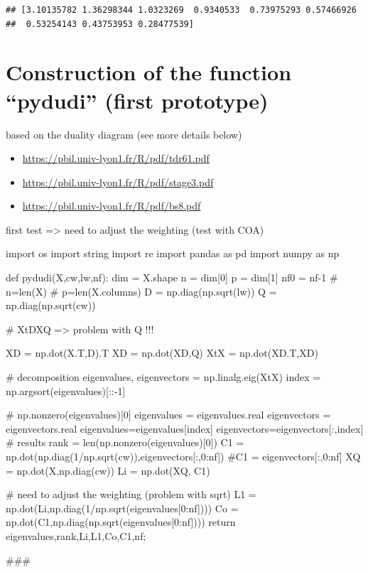 \documentclass[
  10pt,
]{article}
\newenvironment{Shaded}{\begin{snugshade}}{\end{snugshade}}
\newcommand{\NormalTok}[1]{#1}
\providecommand{\tightlist}{%
  \setlength{\itemsep}{0pt}\setlength{\parskip}{0pt}}
\begin{document}
\begin{verbatim}
## [3.10135782 1.36298344 1.0323269  0.9340533  0.73975293 0.57466926
##  0.53254143 0.43753953 0.28477539]
\end{verbatim}

\hypertarget{construction-of-the-function-pydudi-first-prototype}{%
\section{Construction of the function ``pydudi'' (first
prototype)}\label{construction-of-the-function-pydudi-first-prototype}}

based on the duality diagram (see more details below)

\begin{itemize}
\tightlist
\item
  \url{https://pbil.univ-lyon1.fr/R/pdf/tdr61.pdf}
\item
  \url{https://pbil.univ-lyon1.fr/R/pdf/stage3.pdf}
\item
  \url{https://pbil.univ-lyon1.fr/R/pdf/bs8.pdf}
\end{itemize}

first test =\textgreater{} need to adjust the weighting (test with COA)

\begin{Shaded}
\begin{Highlighting}[]
\NormalTok{import os}
\NormalTok{import string}
\NormalTok{import re}
\NormalTok{import pandas as pd}
\NormalTok{import numpy as np}

\NormalTok{def pydudi(X,cw,lw,nf):}
\NormalTok{  dim = X.shape}
\NormalTok{  n = dim[0]}
\NormalTok{  p = dim[1]}
\NormalTok{  nf0 = nf{-}1}
\NormalTok{  \# n=len(X)}
\NormalTok{  \# p=len(X.columns)}
\NormalTok{  D = np.diag(np.sqrt(lw))}
\NormalTok{  Q = np.diag(np.sqrt(cw))}
  
\NormalTok{  \# XtDXQ =\textgreater{} problem  with Q !!!}
  
\NormalTok{  XD = np.dot(X.T,D).T}
\NormalTok{  XD = np.dot(XD,Q)}
\NormalTok{  XtX = np.dot(XD.T,XD)}
  
  
\NormalTok{  \# decomposition}
\NormalTok{  eigenvalues, eigenvectors = np.linalg.eig(XtX)}
\NormalTok{  index = np.argsort(eigenvalues)[::{-}1]}
  
\NormalTok{  \# np.nonzero(eigenvalues)[0]}
\NormalTok{  eigenvalues = eigenvalues.real}
\NormalTok{  eigenvectors = eigenvectors.real}
\NormalTok{  eigenvalues=eigenvalues[index]}
\NormalTok{  eigenvectors=eigenvectors[:,index]}
\NormalTok{  \# results}
\NormalTok{  rank = len(np.nonzero(eigenvalues)[0])}
\NormalTok{  C1 = np.dot(np.diag(1/np.sqrt(cw)),eigenvectors[:,0:nf])}
\NormalTok{  \#C1 = eigenvectors[:,0:nf]}
\NormalTok{  XQ = np.dot(X,np.diag(cw))}
\NormalTok{  Li = np.dot(XQ, C1)}
  
\NormalTok{  \# need to adjust the weighting (problem with sqrt)}
\NormalTok{  L1 = np.dot(Li,np.diag(1/np.sqrt(eigenvalues[0:nf])))}
\NormalTok{  Co = np.dot(C1,np.diag(np.sqrt(eigenvalues[0:nf])))}
\NormalTok{  return eigenvalues,rank,Li,L1,Co,C1,nf;}

\NormalTok{\#\#\#}
\end{Highlighting}
\end{Shaded}
\end{document}
